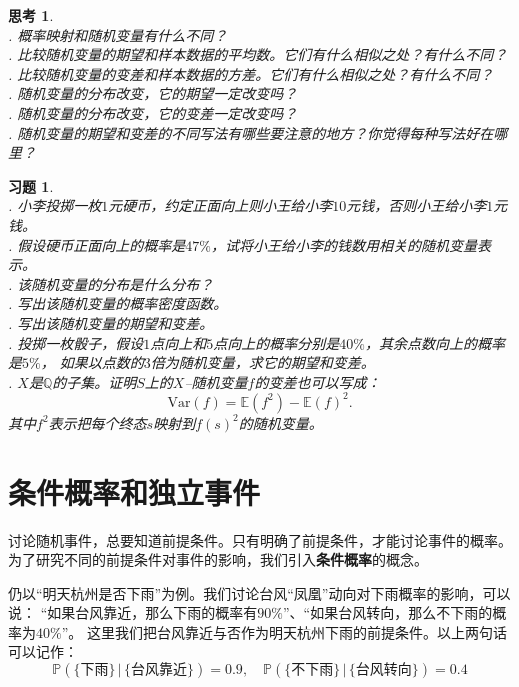 \documentclass[12pt,UTF8]{ctexbook}
\theoremstyle{definition}
\theoremstyle{plain}
\newtheorem{sk}{思考}[section]
\newtheorem{xt}{习题}[section]
\begin{document}
\begin{sk}
    \mbox{} \\
    . 概率映射和随机变量有什么不同？ \\
    . 比较随机变量的期望和样本数据的平均数。它们有什么相似之处？有什么不同？\\
    . 比较随机变量的变差和样本数据的方差。它们有什么相似之处？有什么不同？\\
    . 随机变量的分布改变，它的期望一定改变吗？\\
    . 随机变量的分布改变，它的变差一定改变吗？ \\
    . 随机变量的期望和变差的不同写法有哪些要注意的地方？你觉得每种写法好在哪里？   
\end{sk}

\begin{xt}
    \mbox{} \\
    . 小李投掷一枚$1$元硬币，约定正面向上则小王给小李$10$元钱，否则小王给小李$1$元钱。\\
    . 假设硬币正面向上的概率是$47\%$，试将小王给小李的钱数用相关的随机变量表示。\\
    . 该随机变量的分布是什么分布？    \\
    . 写出该随机变量的概率密度函数。\\
    . 写出该随机变量的期望和变差。\\
    . 投掷一枚骰子，假设$1$点向上和$5$点向上的概率分别是$40\%$，其余点数向上的概率是$5\%$，
    如果以点数的$3$倍为随机变量，求它的期望和变差。\\
    . $X$是$\mathbb{Q}$的子集。证明$S$上的$X$–随机变量$f$的变差也可以写成：
    $$ \mathrm{Var}(f)  = \mathbb{E}(f^2) - \mathbb{E}(f)^2.$$  
    \indent \hspace{1em}  其中$f^2$表示把每个终态$s$映射到$f(s)^2$的随机变量。
\end{xt}

\section{条件概率和独立事件}
讨论随机事件，总要知道前提条件。只有明确了前提条件，才能讨论事件的概率。
为了研究不同的前提条件对事件的影响，我们引入\textbf{条件概率}的概念。

仍以“明天杭州是否下雨”为例。我们讨论台风“凤凰”动向对下雨概率的影响，可以说：
“如果台风靠近，那么下雨的概率有$90\%$”、“如果台风转向，那么不下雨的概率为$40\%$”。
这里我们把台风靠近与否作为明天杭州下雨的前提条件。以上两句话可以记作：
$$ \mathbb{P} (\{\mbox{下雨}\} \, | \, \{\mbox{台风靠近}\}) = 0.9, \quad \mathbb{P} (\{\mbox{不下雨}\} \, | \, \{\mbox{台风转向}\}) = 0.4$$
\end{document}
